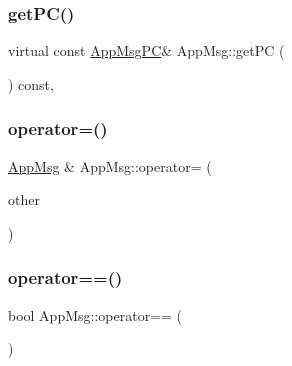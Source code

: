 \mbox{\label{classAppMsg_a19864419107e294ac7c64553ceb5a9f0}} 
\subsubsection{\texorpdfstring{get\+P\+C()}{getPC()}\hspace{0.1cm}{\footnotesize\ttfamily [2/2]}}
{\footnotesize\ttfamily virtual const \hyperlink{AppMsg__m_8h_abcd76636e4b750d033ffc348601dd7a2}{App\+Msg\+PC}\& App\+Msg\+::get\+PC (\begin{DoxyParamCaption}{ }\end{DoxyParamCaption}) const\hspace{0.3cm}{\ttfamily [inline]}, {\ttfamily [virtual]}}

\mbox{\label{classAppMsg_abb8f6f1fa21e6597ff28f6df72b435ad}} 
\subsubsection{\texorpdfstring{operator=()}{operator=()}}
{\footnotesize\ttfamily \hyperlink{classAppMsg}{App\+Msg} \& App\+Msg\+::operator= (\begin{DoxyParamCaption}\item[{const \hyperlink{classAppMsg}{App\+Msg} \&}]{other }\end{DoxyParamCaption})}

\mbox{\label{classAppMsg_a5eb13ac34b1364ca33dbf8f563b9e81c}} 
\subsubsection{\texorpdfstring{operator==()}{operator==()}}
{\footnotesize\ttfamily bool App\+Msg\+::operator== (\begin{DoxyParamCaption}\item[{const \hyperlink{classAppMsg}{App\+Msg} \&}]{ }\end{DoxyParamCaption})\hspace{0.3cm}{\ttfamily [protected]}}

\mbox{\label{classAppMsg_a97036583c6a13015d1be1ac6cf87505e}} 

